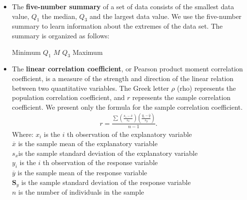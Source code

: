 \documentclass{report}
\begin{document}
\begin{itemize}
        \item The \textbf{five-number summary} of a set of data consists of the smallest data value, $Q_{1} $  the median, $Q_{3} $  and the largest data value. We use the five-number summary to learn information about the extremes of the data set. The summary is organized as follows:
        \begin{center}
           Minimum $Q_{1} $ $M$ $Q_{3} $  Maximum
        \end{center}
        \item The \textbf{linear correlation coefficient}, or Pearson product moment correlation coefficient, is a measure of the strength and direction of the linear relation between two quantitative variables. The Greek letter $\rho $ (rho) represents the population correlation coefficient, and $r $ represents the sample correlation coefficient. We present only the formula for the sample correlation coefficient.
            \begin{align*}
                r =\frac{\sum\left(\frac{x_i-\bar{x}}{s_x}\right)\left(\frac{y_i-\bar{y}}{s_y}\right)}{n-1}
            .\end{align*}
            Where:
            \bigbreak \noindent 
                $x_i$ is the $i$ th observation of the explanatory variable \\
                $\overline{x}$ is the sample mean of the explanatory variable \\
                $s_{x} $is the sample standard deviation of the explanatory variable \\
                $y_i$ is the $i$ th observation of the response variable \\
                $\overline{y}$ is the sample mean of the response variable \\
                $\mathbf{S}_y$ is the sample standard deviation of the response variable \\
                $n$ is the number of individuals in the sample


\end{itemize}
\end{document}
